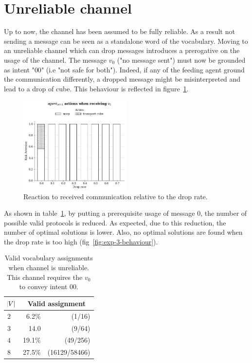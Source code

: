 
\section{Unreliable channel}

Up to now, the channel has been assumed to be fully reliable. As a result not sending a message can be seen as a standalone word of the vocabulary. Moving to an unreliable channel which can drop messages introduces a prerogative on the usage of the channel. The message $v_0$ ("no message sent") must now be grounded as intent "$00$" (i.e "not safe for both"). Indeed, if any of the feeding agent ground the communication differently, a dropped message might be misinterpreted and lead to a drop of cube. This behaviour is reflected in figure~\ref{fig:exp-3-grounding}.

\begin{figure}[ht]
\centering
\includegraphics[width=0.5\textwidth]{imgs/exp-3-2msg-grounding-a1.png}
\caption[Reaction to received communication relative to the drop rate]{Reaction to received communication relative to the drop rate.}
\label{fig:exp-3-grounding}
\end{figure}

As shown in table~\ref{tab:exp-3-assigments}, by putting a prerequisite usage of message $0$, the number of possible valid protocols is reduced.  As expected, due to this reduction, the number of optimal solutions is lower. Also, no optimal solutions are found when the drop rate is too high (fig~\ref{fig:exp-3-behaviour}).
\begin{table}[ht]
    \centering
    \begin{tabular}{lrr}
    \toprule
    $\abs{V} $ & \multicolumn{2}{c}{Valid assignment} \\
    \midrule
    $2$ & 6.2\% & (1/16)\\
    $3$ & 14.0 & (9/64) \\
    $4$ & 19.1\% & (49/256)\\
    $8$ & 27.5\% & (16129/58466)\\
    \bottomrule
    \end{tabular}
    \caption[Valid vocabulary assignments with unreliable channel]{Valid vocabulary assignments when channel is unreliable. This channel requires the $v_0$ to convey intent $00$.}
    \label{tab:exp-3-assigments}
\end{table}


